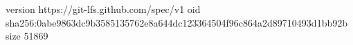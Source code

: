 version https://git-lfs.github.com/spec/v1
oid sha256:0abe9863dc9b3585135762e8a644dc123364504f96c864a2d89710493d1bb92b
size 51869
